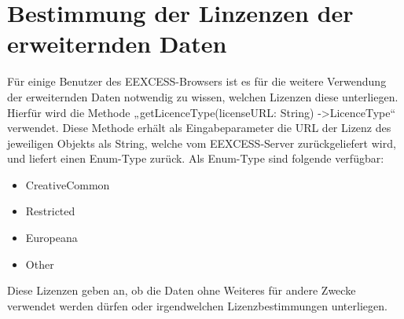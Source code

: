 \documentclass[a4paper,10pt]{article}
\begin{document}
\chapter{Bestimmung der Linzenzen der erweiternden Daten}
Für einige Benutzer des EEXCESS-Browsers ist es für die weitere Verwendung der erweiternden Daten notwendig zu wissen, welchen Lizenzen diese unterliegen. Hierfür wird die Methode „getLicenceType(licenseURL: String) ->LicenceType“ verwendet. Diese Methode erhält als Eingabeparameter die URL der Lizenz des jeweiligen Objekts als String, welche vom EEXCESS-Server zurückgeliefert wird, und liefert einen Enum-Type zurück. Als Enum-Type sind folgende verfügbar:
\begin{itemize}
\item CreativeCommon
\item Restricted
\item Europeana
\item Other
\end{itemize}

Diese Lizenzen geben an, ob die Daten ohne Weiteres für andere Zwecke verwendet werden dürfen oder irgendwelchen Lizenzbestimmungen unterliegen.
\end{document}
